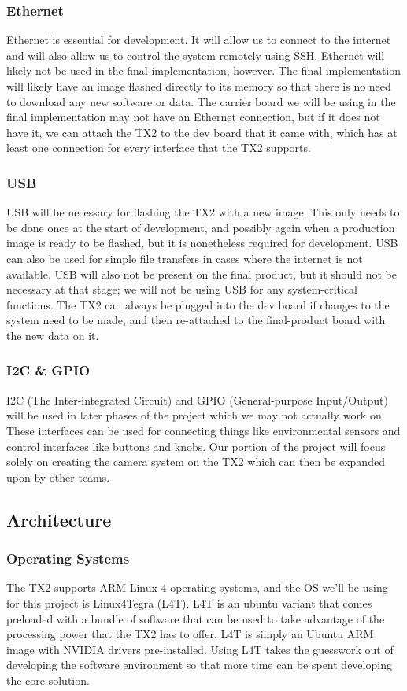\documentclass[letterpaper,10pt,serif,draftclsnofoot,onecolumn,compsoc,titlepage]{IEEEtran}
\begin{document}
\subsubsection{Ethernet}
Ethernet is essential for development. It will allow us to connect to the internet and will also allow us to control the system remotely using SSH. Ethernet will likely not be used in the final implementation, however. The final implementation will likely have an image flashed directly to its memory so that there is no need to download any new software or data. The carrier board we will be using in the final implementation may not have an Ethernet connection, but if it does not have it, we can attach the TX2 to the dev board that it came with, which has at least one connection for every interface that the TX2 supports.

\subsubsection{USB}
USB will be necessary for flashing the TX2 with a new image. This only needs to be done once at the start of development, and possibly again when a production image is ready to be flashed, but it is nonetheless required for development. USB can also be used for simple file transfers in cases where the internet is not available. USB will also not be present on the final product, but it should not be necessary at that stage; we will not be using USB for any system-critical functions. The TX2 can always be plugged into the dev board if changes to the system need to be made, and then re-attached to the final-product board with the new data on it.

\subsubsection{I2C \& GPIO}
I2C (The Inter-integrated Circuit) and GPIO (General-purpose Input/Output) will be used in later phases of the project which we may not actually work on. These interfaces can be used for connecting things like environmental sensors and control interfaces like buttons and knobs. Our portion of the project will focus solely on creating the camera system on the TX2 which can then be expanded upon by other teams.

\subsection{Architecture}
\subsubsection{Operating Systems}
The TX2 supports ARM Linux 4 operating systems, and the OS we’ll be using for this project is Linux4Tegra (L4T). L4T is an ubuntu variant that comes preloaded with a bundle of software that can be used to take advantage of the processing power that the TX2 has to offer. L4T is simply an Ubuntu ARM image with NVIDIA drivers pre-installed. Using L4T takes the guesswork out of developing the software environment so that more time can be spent developing the core solution.
\end{document}
